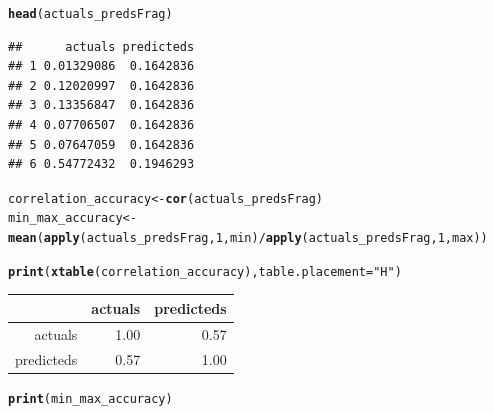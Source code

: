 \documentclass[10pt]{article}\usepackage[]{graphicx}\usepackage[]{color}
\makeatletter
\newcommand{\hlnum}[1]{\textcolor[rgb]{0.686,0.059,0.569}{#1}}%
\newcommand{\hlstr}[1]{\textcolor[rgb]{0.192,0.494,0.8}{#1}}%
\newcommand{\hlopt}[1]{\textcolor[rgb]{0,0,0}{#1}}%
\newcommand{\hlstd}[1]{\textcolor[rgb]{0.345,0.345,0.345}{#1}}%
\newcommand{\hlkwb}[1]{\textcolor[rgb]{0.69,0.353,0.396}{#1}}%
\newcommand{\hlkwc}[1]{\textcolor[rgb]{0.333,0.667,0.333}{#1}}%
\newcommand{\hlkwd}[1]{\textcolor[rgb]{0.737,0.353,0.396}{\textbf{#1}}}%
\newenvironment{kframe}{%
 \def\at@end@of@kframe{}%
 \ifinner\ifhmode%
  \def\at@end@of@kframe{\end{minipage}}%
  \begin{minipage}{\columnwidth}%
 \fi\fi%
 \def\FrameCommand##1{\hskip\@totalleftmargin \hskip-\fboxsep
 \colorbox{shadecolor}{##1}\hskip-\fboxsep
     \hskip-\linewidth \hskip-\@totalleftmargin \hskip\columnwidth}%
 \MakeFramed {\advance\hsize-\width
   \@totalleftmargin\z@ \linewidth\hsize
   \@setminipage}}%
 {\par\unskip\endMakeFramed%
 \at@end@of@kframe}
\newenvironment{knitrout}{}{} %
\makeatother
\begin{document}
\begin{knitrout}
\begin{kframe}
\begin{alltt}
\hlkwd{head}\hlstd{(actuals_predsFrag)}
\end{alltt}
\begin{verbatim}
##      actuals predicteds
## 1 0.01329086  0.1642836
## 2 0.12020997  0.1642836
## 3 0.13356847  0.1642836
## 4 0.07706507  0.1642836
## 5 0.07647059  0.1642836
## 6 0.54772432  0.1946293
\end{verbatim}
\begin{alltt}
\hlstd{correlation_accuracy} \hlkwb{<-} \hlkwd{cor}\hlstd{(actuals_predsFrag)}
\hlstd{min_max_accuracy} \hlkwb{<-} \hlkwd{mean}\hlstd{(}\hlkwd{apply}\hlstd{(actuals_predsFrag,} \hlnum{1}\hlstd{, min)} \hlopt{/} \hlkwd{apply}\hlstd{(actuals_predsFrag,} \hlnum{1}\hlstd{, max))}
\end{alltt}
\end{kframe}
\end{knitrout}


\begin{kframe}
\begin{alltt}
\hlkwd{print}\hlstd{(}\hlkwd{xtable}\hlstd{(correlation_accuracy),}\hlkwc{table.placement}\hlstd{=}\hlstr{"H"}\hlstd{)}
\end{alltt}
\end{kframe}%
\begin{table}[H]
\centering
\begin{tabular}{rrr}
  \hline
 & actuals & predicteds \\ 
  \hline
actuals & 1.00 & 0.57 \\ 
  predicteds & 0.57 & 1.00 \\ 
   \hline
\end{tabular}
\end{table}
\begin{kframe}\begin{alltt}
\hlkwd{print}\hlstd{(min_max_accuracy)}
\end{alltt}
\end{kframe}[1] 0.637178
\end{document}
